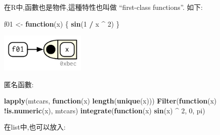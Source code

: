 \documentclass[]{book}
\newenvironment{Shaded}{\begin{snugshade}}{\end{snugshade}}
\newcommand{\ControlFlowTok}[1]{\textcolor[rgb]{0.13,0.29,0.53}{\textbf{#1}}}
\newcommand{\DataTypeTok}[1]{\textcolor[rgb]{0.13,0.29,0.53}{#1}}
\newcommand{\DecValTok}[1]{\textcolor[rgb]{0.00,0.00,0.81}{#1}}
\newcommand{\KeywordTok}[1]{\textcolor[rgb]{0.13,0.29,0.53}{\textbf{#1}}}
\newcommand{\NormalTok}[1]{#1}
\newcommand{\OperatorTok}[1]{\textcolor[rgb]{0.81,0.36,0.00}{\textbf{#1}}}
\newcommand{\StringTok}[1]{\textcolor[rgb]{0.31,0.60,0.02}{#1}}
\theoremstyle{definition}
\theoremstyle{definition}
\theoremstyle{definition}
\theoremstyle{remark}
\begin{document}
在R中,函數也是物件,這種特性也叫做 ``first-class functions''. 如下:

\begin{Shaded}
\begin{Highlighting}[]
\NormalTok{f01 <-}\StringTok{ }\ControlFlowTok{function}\NormalTok{(x) \{}
  \KeywordTok{sin}\NormalTok{(}\DecValTok{1} \OperatorTok{/}\StringTok{ }\NormalTok{x }\OperatorTok{^}\StringTok{ }\DecValTok{2}\NormalTok{)}
\NormalTok{\}}
\end{Highlighting}
\end{Shaded}

\begin{center}\includegraphics[width=1.62in]{diagrams/functions/first-class} \end{center}

匿名函數:

\begin{Shaded}
\begin{Highlighting}[]
\KeywordTok{lapply}\NormalTok{(mtcars, }\ControlFlowTok{function}\NormalTok{(x) }\KeywordTok{length}\NormalTok{(}\KeywordTok{unique}\NormalTok{(x)))}
\KeywordTok{Filter}\NormalTok{(}\ControlFlowTok{function}\NormalTok{(x) }\OperatorTok{!}\KeywordTok{is.numeric}\NormalTok{(x), mtcars)}
\KeywordTok{integrate}\NormalTok{(}\ControlFlowTok{function}\NormalTok{(x) }\KeywordTok{sin}\NormalTok{(x) }\OperatorTok{^}\StringTok{ }\DecValTok{2}\NormalTok{, }\DecValTok{0}\NormalTok{, pi)}
\end{Highlighting}
\end{Shaded}

在list中,也可以放入:

\begin{Shaded}
\end{Shaded}
\end{document}
